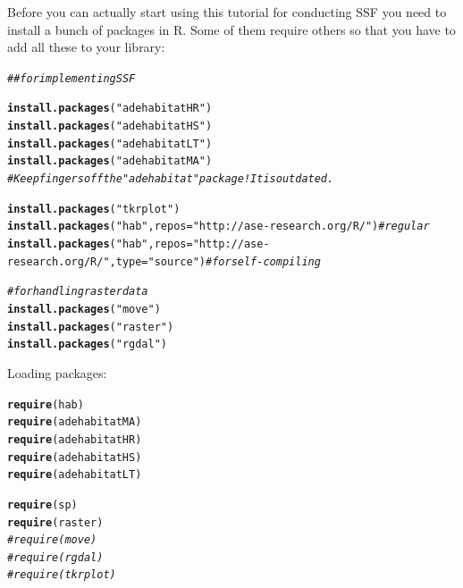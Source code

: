 \documentclass[11pt, a4paper]{article}\usepackage[]{graphicx}\usepackage[]{color}
\makeatletter
\newcommand{\hlstr}[1]{\textcolor[rgb]{0.192,0.494,0.8}{#1}}%
\newcommand{\hlcom}[1]{\textcolor[rgb]{0.678,0.584,0.686}{\textit{#1}}}%
\newcommand{\hlstd}[1]{\textcolor[rgb]{0.345,0.345,0.345}{#1}}%
\newcommand{\hlkwc}[1]{\textcolor[rgb]{0.333,0.667,0.333}{#1}}%
\newcommand{\hlkwd}[1]{\textcolor[rgb]{0.737,0.353,0.396}{\textbf{#1}}}%
\newenvironment{kframe}{%
 \def\at@end@of@kframe{}%
 \ifinner\ifhmode%
  \def\at@end@of@kframe{\end{minipage}}%
  \begin{minipage}{\columnwidth}%
 \fi\fi%
 \def\FrameCommand##1{\hskip\@totalleftmargin \hskip-\fboxsep
 \colorbox{shadecolor}{##1}\hskip-\fboxsep
     \hskip-\linewidth \hskip-\@totalleftmargin \hskip\columnwidth}%
 \MakeFramed {\advance\hsize-\width
   \@totalleftmargin\z@ \linewidth\hsize
   \@setminipage}}%
 {\par\unskip\endMakeFramed%
 \at@end@of@kframe}
\newenvironment{knitrout}{}{} %
\makeatother
\begin{document}
Before you can actually start using this tutorial for conducting SSF you need to install a bunch of packages in R. Some of them require others so that you have to add all these to your library:

\begin{knitrout}
\color{fgcolor}\begin{kframe}
\begin{alltt}
\hlcom{## for implementing SSF}

\hlkwd{install.packages}\hlstd{(}\hlstr{"adehabitatHR"}\hlstd{)}
\hlkwd{install.packages}\hlstd{(}\hlstr{"adehabitatHS"}\hlstd{)}
\hlkwd{install.packages}\hlstd{(}\hlstr{"adehabitatLT"}\hlstd{)}
\hlkwd{install.packages}\hlstd{(}\hlstr{"adehabitatMA"}\hlstd{)}
\hlcom{# Keep fingers off the "adehabitat" package! It is outdated.}

\hlkwd{install.packages}\hlstd{(}\hlstr{"tkrplot"}\hlstd{)}
\hlkwd{install.packages}\hlstd{(}\hlstr{"hab"}\hlstd{,} \hlkwc{repos} \hlstd{=} \hlstr{"http://ase-research.org/R/"}\hlstd{)} \hlcom{# regular}
\hlkwd{install.packages}\hlstd{(}\hlstr{"hab"}\hlstd{,} \hlkwc{repos} \hlstd{=} \hlstr{"http://ase-research.org/R/"}\hlstd{,} \hlkwc{type} \hlstd{=} \hlstr{"source"}\hlstd{)} \hlcom{# for self-compiling}

\hlcom{# for handling raster data}
\hlkwd{install.packages}\hlstd{(}\hlstr{"move"}\hlstd{)}
\hlkwd{install.packages}\hlstd{(}\hlstr{"raster"}\hlstd{)}
\hlkwd{install.packages}\hlstd{(}\hlstr{"rgdal"}\hlstd{)}
\end{alltt}
\end{kframe}
\end{knitrout}

Loading packages:

\begin{knitrout}
\color{fgcolor}\begin{kframe}
\begin{alltt}
\hlkwd{require}\hlstd{(hab)}
\hlkwd{require}\hlstd{(adehabitatMA)}
\hlkwd{require}\hlstd{(adehabitatHR)}
\hlkwd{require}\hlstd{(adehabitatHS)}
\hlkwd{require}\hlstd{(adehabitatLT)}

\hlkwd{require}\hlstd{(sp)}
\hlkwd{require}\hlstd{(raster)}
\hlcom{#require(move)}
\hlcom{#require(rgdal)}
\hlcom{#require(tkrplot)}
\end{alltt}
\end{kframe}
\end{knitrout}
\end{document}
